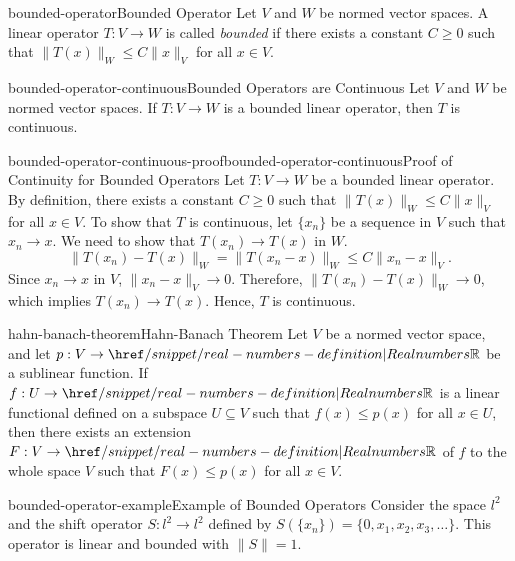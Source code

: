 \documentclass[preview]{standalone}
\begin{document}
\begin{snippetdefinition}{bounded-operator}{Bounded Operator}
    Let \(V\) and \(W\) be normed vector spaces. A linear operator \(T: V \to W\) is called \textit{bounded} if there exists a constant \(C \geq 0\) such that \(\|T(x)\|_W \leq C\|x\|_V\) for all \(x \in V\).
\end{snippetdefinition}

\begin{snippettheorem}{bounded-operator-continuous}{Bounded Operators are Continuous}
    Let \(V\) and \(W\) be normed vector spaces. If \(T: V \to W\) is a bounded linear operator, then \(T\) is continuous.
\end{snippettheorem}

\begin{snippetproof}{bounded-operator-continuous-proof}{bounded-operator-continuous}{Proof of Continuity for Bounded Operators}
    Let \(T: V \to W\) be a bounded linear operator. By definition, there exists a constant \(C \geq 0\) such that \(\|T(x)\|_W \leq C\|x\|_V\) for all \(x \in V\). To show that \(T\) is continuous, let \(\{x_n\}\) be a sequence in \(V\) such that \(x_n \to x\). We need to show that \(T(x_n) \to T(x)\) in \(W\).
    \[
        \|T(x_n) - T(x)\|_W = \|T(x_n - x)\|_W \leq C\|x_n - x\|_V.
    \]
    Since \(x_n \to x\) in \(V\), \(\|x_n - x\|_V \to 0\). Therefore, \(\|T(x_n) - T(x)\|_W \to 0\), which implies \(T(x_n) \to T(x)\). Hence, \(T\) is continuous.
\end{snippetproof}

\begin{snippettheorem}{hahn-banach-theorem}{Hahn-Banach Theorem}
    Let \(V\) be a normed vector space, and let \(p: V \to \realnumbers\) be a sublinear function. If \(f: U \to \realnumbers\) is a linear functional defined on a subspace \(U \subseteq V\) such that \(f(x) \leq p(x)\) for all \(x \in U\), then there exists an extension \(F: V \to \realnumbers\) of \(f\) to the whole space \(V\) such that \(F(x) \leq p(x)\) for all \(x \in V\).
\end{snippettheorem}

\begin{snippetexample}{bounded-operator-example}{Example of Bounded Operators}
    Consider the space \(l^2\) and the shift operator \(S: l^2 \to l^2\) defined by \(S(\{x_n\}) = \{0, x_1, x_2, x_3, \ldots\}\). This operator is linear and bounded with \(\|S\| = 1\).
\end{snippetexample}
\end{document}
